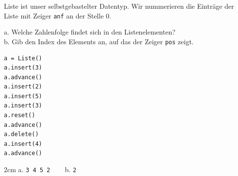 \question[2]
Liste ist unser selbstgebastelter Datentyp.
Wir nummerieren die Einträge der Liste mit Zeiger \texttt{anf} an der Stelle 0.

a. Welche Zahlenfolge findet sich in den Listenelementen? \\
b. Gib den Index des Elements an, auf das der Zeiger \texttt{pos} zeigt.
 
\begin{lstlisting}
a = Liste()
a.insert(3)
a.advance()
a.insert(2)
a.insert(5)
a.insert(3)
a.reset()
a.advance()
a.delete()
a.insert(4)
a.advance()
\end{lstlisting}
\begin{solutionbox}{2cm}
a. \texttt{3 4 5 2}  ~~~
b. \texttt{2}
\end{solutionbox}
